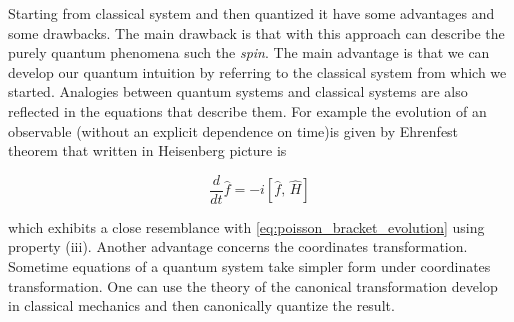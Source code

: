 Starting from classical system and then quantized it have some advantages and
some drawbacks. The main drawback is that with this approach can describe the
purely quantum phenomena such the \emph{spin}. The main advantage is that we can
develop our quantum intuition by referring to the classical system from which we
started. Analogies between quantum systems and classical systems are also
reflected in the equations that describe them. For example the evolution of an
observable (without an explicit dependence on time)is given by Ehrenfest theorem
that written in Heisenberg picture is

\begin{equation*}
  \frac{d}{dt} \hat{f} = -i \left[ \hat{f}, \, \hat{H} \right]
\end{equation*}

which exhibits a close resemblance with \eqref{eq:poisson_bracket_evolution}
using property (iii). Another advantage concerns the coordinates transformation.
Sometime equations of a quantum system take simpler form under coordinates
transformation. One can use the theory of the canonical transformation develop
in classical mechanics and then canonically quantize the result.

